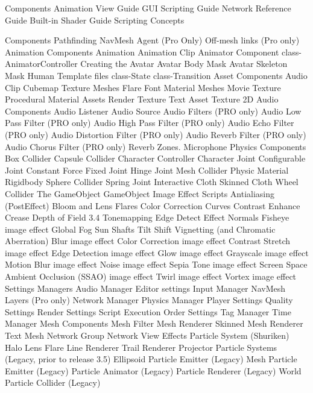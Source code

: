 Components
Animation View Guide
GUI Scripting Guide
Network Reference Guide
Built-in Shader Guide
Scripting Concepts
  
  
Components
  Pathfinding
  NavMesh Agent (Pro Only)
  Off-mesh links (Pro only)
  Animation Components
  Animation
  Animation Clip
  Animator Component
  class-AnimatorController
  Creating the Avatar
  Avatar Body Mask
  Avatar Skeleton Mask
  Human Template files
  class-State
  class-Transition
  Asset Components
  Audio Clip
  Cubemap Texture
  Meshes
  Flare
  Font
  Material
  Meshes
  Movie Texture
  Procedural Material Assets
  Render Texture
  Text Asset
  Texture 2D
  Audio Components
  Audio Listener
  Audio Source
  Audio Filters (PRO only)
  Audio Low Pass Filter (PRO only)
  Audio High Pass Filter (PRO only)
  Audio Echo Filter (PRO only)
  Audio Distortion Filter (PRO only)
  Audio Reverb Filter (PRO only)
  Audio Chorus Filter (PRO only)
  Reverb Zones.
  Microphone
  Physics Components
  Box Collider
  Capsule Collider
  Character Controller
  Character Joint
  Configurable Joint
  Constant Force
  Fixed Joint
  Hinge Joint
  Mesh Collider
  Physic Material
  Rigidbody
  Sphere Collider
  Spring Joint
  Interactive Cloth
  Skinned Cloth
  Wheel Collider
  The GameObject
  GameObject
  Image Effect Scripts
  Antialiasing (PostEffect)
  Bloom and Lens Flares
  Color Correction Curves
  Contrast Enhance
  Crease
  Depth of Field 3.4
  Tonemapping
  Edge Detect Effect Normals
  Fisheye image effect
  Global Fog
  Sun Shafts
  Tilt Shift
  Vignetting (and Chromatic Aberration)
  Blur image effect
  Color Correction image effect
  Contrast Stretch image effect
  Edge Detection image effect
  Glow image effect
  Grayscale image effect
  Motion Blur image effect
  Noise image effect
  Sepia Tone image effect
  Screen Space Ambient Occlusion (SSAO) image effect
  Twirl image effect
  Vortex image effect
  Settings Managers
  Audio Manager
  Editor settings
  Input Manager
  NavMesh Layers (Pro only)
  Network Manager
  Physics Manager
  Player Settings
  Quality Settings
  Render Settings
  Script Execution Order Settings
  Tag Manager
  Time Manager
  Mesh Components
  Mesh Filter
  Mesh Renderer
  Skinned Mesh Renderer
  Text Mesh
  Network Group
  Network View
  Effects
  Particle System (Shuriken)
  Halo
  Lens Flare
  Line Renderer
  Trail Renderer
  Projector
  Particle Systems (Legacy, prior to release 3.5)
  Ellipsoid Particle Emitter (Legacy)
  Mesh Particle Emitter (Legacy)
  Particle Animator (Legacy)
  Particle Renderer (Legacy)
  World Particle Collider (Legacy)
